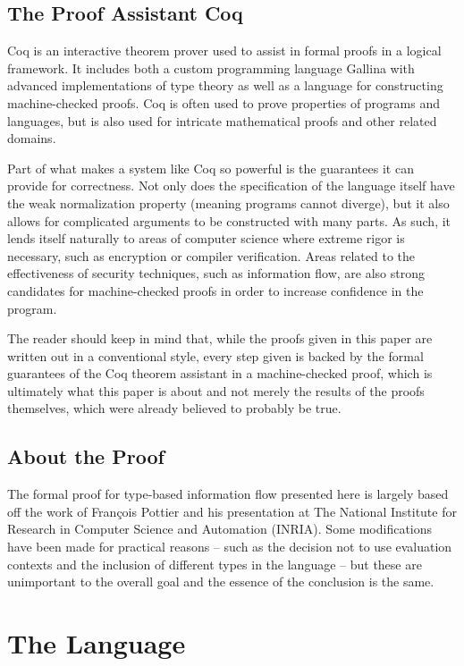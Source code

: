 \documentclass[12pt]{report}
\begin{document}
\section{The Proof Assistant Coq}



 Coq is an interactive theorem prover used to assist in formal
proofs in a logical framework. It includes both a custom programming
language Gallina with advanced implementations of type theory as well
as a language for constructing machine-checked proofs. Coq is often
used to prove properties of programs and languages, but is also used
for intricate mathematical proofs and other related domains.


Part of what makes a system like Coq so powerful is the guarantees it
can provide for correctness. Not only does the specification of the
language itself have the weak normalization property (meaning
programs cannot diverge), but it also allows for complicated
arguments to be constructed with many parts. As such, it lends itself
naturally to areas of computer science where extreme rigor is
necessary, such as encryption or compiler verification. Areas related
to the effectiveness of security techniques, such as information
flow, are also strong candidates for machine-checked proofs in order
to increase confidence in the program.


The reader should keep in mind that, while the proofs given in this
paper are written out in a conventional style, every step given is
backed by the formal guarantees of the Coq theorem assistant in
a machine-checked proof, which is ultimately what this paper is about
and not merely the results of the proofs themselves, which were
already believed to probably be true. 

\section{About the Proof}



 The formal proof for type-based information flow presented here
is largely based off the work of François Pottier and his
presentation at The National Institute for Research in Computer
Science and Automation (INRIA). Some modifications have been made for
practical reasons – such as the decision not to use evaluation
contexts and the inclusion of different types in the language – but
these are unimportant to the overall goal and the essence of the
conclusion is the same. 

\chapter{The Language}
\end{document}
